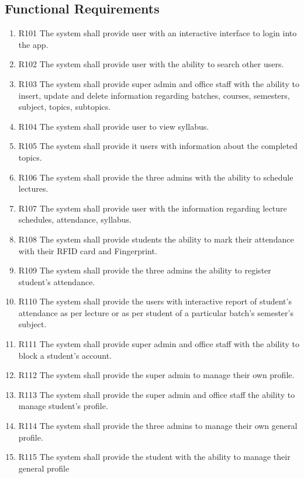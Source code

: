 \subsection{Functional Requirements}
    \begin{enumerate}
        \item R101 The system shall provide user with an interactive interface to login into the app.
        \item R102 The system shall provide user with the ability to search other users.
        \item R103 The system shall provide super admin and office staff with the ability to insert, update and delete information regarding batches, courses, semesters, subject, topics, subtopics.
        \item R104 The system shall provide user to view syllabus.
        \item R105 The system shall provide it users with information about the completed topics.
        \item R106 The system shall provide the three admins with the ability to schedule lectures.
        \item R107 The system shall provide user with the information regarding lecture schedules, attendance, syllabus.
        \item R108 The system shall provide students the ability to mark their attendance with their RFID card and Fingerprint.
        \item R109 The system shall provide the three admins the ability to register student's attendance.
        \item R110 The system shall provide the users with interactive report of student's attendance as per lecture or as per student of a particular batch's semester's subject.
        \item R111 The system shall provide super admin and office staff with the ability to block a student's account.
        \item R112 The system shall provide the super admin to manage their own profile.
        \item R113 The system shall provide the super admin and office staff the ability to manage student's profile.
        \item R114 The system shall provide the three admins to manage their own general profile.
        \item R115 The system shall provide the student with the ability to manage their general profile
        
    \end{enumerate}

